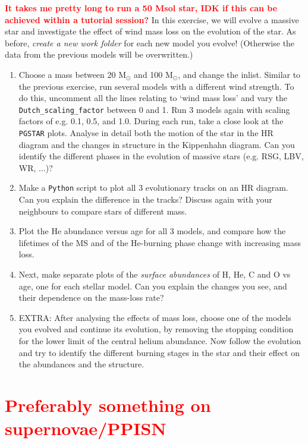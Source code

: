 \documentclass[11pt,a4paper]{article}
\newcommand{\todo}[1]{\textbf{\textcolor{red}{#1}}}
\begin{document}
\todo{It takes me pretty long to run a 50 Msol star, IDK if this can be achieved within a tutorial session?}
In this exercise, we will evolve a massive star and investigate the effect of wind mass loss on the evolution of the star. As before, \emph{create a new work folder} for each new model you evolve! (Otherwise the data from the previous models will be overwritten.)
\begin{enumerate}
\item Choose a mass between 20 M$_\odot$ and 100 M$_\odot$, and change the inlist. Similar to the previous exercise, run several models with a different wind strength. To do this, uncomment all the lines relating to `wind mass loss' and vary the \verb|Dutch_scaling_factor| between 0 and 1. Run 3 models again with scaling factors of e.g. 0.1, 0.5, and 1.0. During each run, take a close look at the \texttt{PGSTAR} plots. Analyse in detail both the motion of the star in the HR diagram and the changes in structure in the Kippenhahn diagram. Can you identify the different phases in the evolution of massive stars (e.g. RSG, LBV, WR, ...)? %
\item Make a \texttt{Python} script to plot all 3 evolutionary tracks on an HR diagram. Can you explain the difference in the tracks? Discuss again with your neighbours to compare stars of different mass.
\item Plot the He abundance versus age for all 3 models, and compare how the lifetimes of the MS and of the He-burning phase change with increasing mass loss.
\item Next, make separate plots of the \emph{surface abundances} of H, He, C and O vs age, one for each stellar model. Can you explain the changes you see, and their dependence on the mass-loss rate?

\item EXTRA: After analysing the effects of mass loss, choose one of the models you evolved and continue its evolution, by removing the stopping condition for the lower limit of the central helium abundance. 
Now follow the evolution and try to identify the different burning stages in the star and their effect on the abundances and the structure. 
\end{enumerate}



\section{\todo{Preferably something on supernovae/PPISN}}



% 
% 
\end{document}

